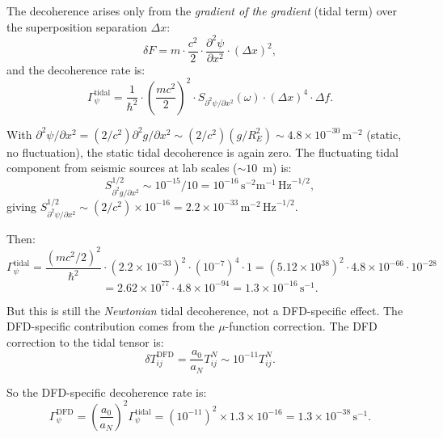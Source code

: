 \documentclass[11pt]{article}
\theoremstyle{definition}
\theoremstyle{remark}
\newcommand{\ee}[1]{\times10^{#1}}
\newcommand{\sqrtHz}{\,\mathrm{Hz}^{-1/2}}
\newcommand{\azero}{a_0}
\begin{document}
The decoherence arises only from the \emph{gradient of the gradient}
(tidal term) over the superposition separation $\Delta x$:
\begin{equation}
\delta F = m \cdot \frac{c^2}{2} \cdot \frac{\partial^2 \psi}{\partial x^2}
\cdot (\Delta x)^2,
\end{equation}
and the decoherence rate is:
\begin{equation}
\Gamma_\psi^{\mathrm{tidal}} = \frac{1}{\hbar^2}
\cdot \left(\frac{mc^2}{2}\right)^2
\cdot S_{\partial^2\psi/\partial x^2}(\omega)
\cdot (\Delta x)^4 \cdot \Delta f.
\end{equation}

With $\partial^2\psi/\partial x^2 = (2/c^2) \partial^2 g/\partial x^2
\sim (2/c^2)(g/R_E^2) \sim 4.8\ee{-30}\,\mathrm{m}^{-2}$ (static, no
fluctuation), the static tidal decoherence is again zero. The
fluctuating tidal component from seismic sources at lab scales
($\sim 10$~m) is:
\begin{equation}
S_{\partial^2 g/\partial x^2}^{1/2} \sim 10^{-15} / 10
= 10^{-16}\,\mathrm{s}^{-2}\mathrm{m}^{-1}\sqrtHz,
\end{equation}
giving $S_{\partial^2\psi/\partial x^2}^{1/2}
\sim (2/c^2) \times 10^{-16} = 2.2\ee{-33}\,\mathrm{m}^{-2}\sqrtHz$.

Then:
\begin{equation}
\Gamma_\psi^{\mathrm{tidal}} = \frac{(mc^2/2)^2}{\hbar^2}
\cdot (2.2\ee{-33})^2 \cdot (10^{-7})^4 \cdot 1
= (5.12\ee{38})^2 \cdot 4.8\ee{-66} \cdot 10^{-28}
\end{equation}
\begin{equation}
= 2.62\ee{77} \cdot 4.8\ee{-94}
= 1.3\ee{-16}\,\mathrm{s}^{-1}.
\end{equation}

But this is still the \emph{Newtonian} tidal decoherence, not a
DFD-specific effect. The DFD-specific contribution comes from the
$\mu$-function correction. The DFD correction to the tidal tensor is:
\begin{equation}
\delta T_{ij}^{\mathrm{DFD}} = \frac{\azero}{a_N} T_{ij}^N
\sim 10^{-11} T_{ij}^N.
\end{equation}

So the DFD-specific decoherence rate is:
\begin{equation}
\Gamma_\psi^{\mathrm{DFD}} = \left(\frac{\azero}{a_N}\right)^2 \Gamma_\psi^{\mathrm{tidal}}
= (10^{-11})^2 \times 1.3\ee{-16}
= 1.3\ee{-38}\,\mathrm{s}^{-1}.
\end{equation}
\end{document}
